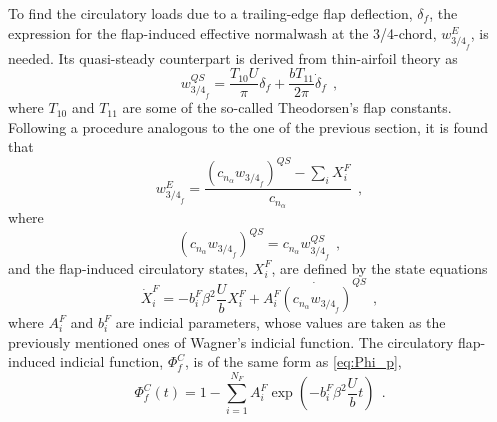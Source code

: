 \documentclass[12pt,a4paper,oneside,english]{abntex2} %
\def\lp{\left(}
\def\rp{\right)}
\def\deltaf{\delta_f}
\def\deltafdot{\dot{\delta}_f}
\begin{document}
To find the circulatory loads due to a trailing-edge flap deflection, $\delta_f$, the expression for the flap-induced effective normalwash at the 3/4-chord, $w_{{3/4}_f}^{E}$, is needed. Its quasi-steady counterpart is derived from thin-airfoil theory \cite{leishman2006principles} as
\begin{equation}
    w_{{3/4}_f}^{QS} =\frac{T_{10}U}{\pi}\deltaf + \frac{bT_{11}}{2\pi}\deltafdot \ \ ,
    \label{eq:w_34f_QS}
\end{equation}
where $T_{10}$ and $T_{11}$ are some of the so-called Theodorsen's flap constants. Following a procedure analogous to the one of the previous section, it is found that
\begin{equation}
    w_{{3/4}_f}^{E} = \frac{\lp c_{n_{\alpha}}w_{{3/4}_f}\rp^{QS} - \sum_i X_i^F}{c_{n_{\alpha}}} \ \ ,
    \label{eq:w_34f_E} 
\end{equation}
where
\begin{equation}
    \lp c_{n_{\alpha}}w_{{3/4}_f}\rp^{QS} = c_{n_{\alpha}}w_{{3/4}_f}^{QS} \ \ ,
    \label{eq:cnaw_f_QS}
\end{equation}
and the flap-induced circulatory states, $X_i^F$, are defined by the state equations
\begin{equation}
    \dot{X}_i^F = -b_i^F\beta^2\frac{U}{b}X_i^F + A_i^F\dot{\lp c_{n_{\alpha}}w_{{3/4}_f}\rp}^{QS} \ \ ,
    \label{eq:state_space_indicial_flap}
\end{equation}
where $A_i^F$ and $b_i^F$ are indicial parameters, whose values are taken as the previously mentioned ones of Wagner's indicial function. The circulatory flap-induced indicial function, $\Phi_f^C$, is of the same form as \cref{eq:Phi_p},
\begin{equation}
    \Phi_f^C(t) = 1 - \sum_{i=1}^{N_F} A_i^F \exp{\lp-b_i^F\beta^2\frac{U}{b}t\rp} \ \ .
    \label{eq:Phi_f}
\end{equation}
\end{document}
